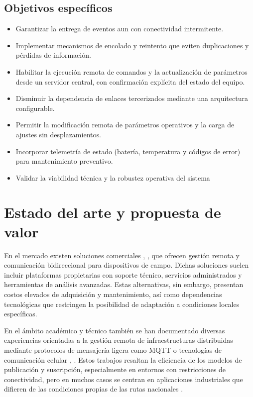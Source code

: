 \subsection{Objetivos específicos}
\begin{itemize}

\item  Garantizar la entrega de eventos aun con conectividad intermitente.

\item Implementar mecanismos de encolado y reintento que eviten duplicaciones y pérdidas de información.

\item  Habilitar la ejecución remota de comandos y la actualización de parámetros desde un servidor central, con confirmación explícita del estado del equipo.

\item  Disminuir la dependencia de enlaces tercerizados mediante una arquitectura configurable.

\item  Permitir la modificación remota de parámetros operativos y la carga de ajustes sin desplazamientos.

\item Incorporar telemetría de estado (batería, temperatura y códigos de error) para mantenimiento preventivo.

\item Validar la viabilidad técnica y la robustez operativa del sistema
\end{itemize}


\section{Estado del arte y propuesta de valor}

En el mercado existen soluciones comerciales \cite{exemys}, \cite{digiRemoteManager}, que ofrecen gestión remota y comunicación bidireccional para dispositivos de campo. Dichas soluciones suelen incluir plataformas propietarias con soporte técnico, servicios administrados y herramientas de análisis avanzadas. Estas alternativas, sin embargo, presentan costos elevados de adquisición y mantenimiento, así como dependencias tecnológicas que restringen la posibilidad de adaptación a condiciones locales específicas.

En el ámbito académico y técnico también se han documentado diversas experiencias orientadas a la gestión remota de infraestructuras distribuidas mediante protocolos de mensajería ligera como MQTT o tecnologías de comunicación celular \cite{monitoringVehicles2023}, \cite{iotSmartTraffic2021}. Estos trabajos resaltan la eficiencia de los modelos de publicación y suscripción, especialmente en entornos con restricciones de conectividad, pero en muchos casos se centran en aplicaciones industriales que difieren de las condiciones propias de las rutas nacionales \cite{iopMQTTSystem2023}.

